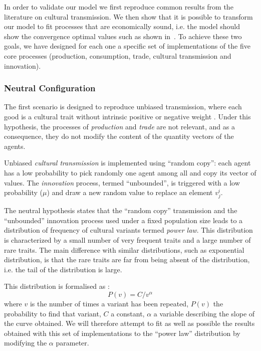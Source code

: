 \documentclass[a4paper]{article}
\begin{document}
In order to validate our model we first reproduce common results from the literature on cultural transmission. We then show that it is possible to transform our model to fit processes that are economically sound, i.e. the model should show the convergence optimal values such as shown in~\cite{gintis_emergence_2006}. To achieve these two goals, we have designed for each one a specific set of implementations of the five core processes (production, consumption, trade, cultural transmission and innovation). 


\subsubsection{Neutral Configuration}\label{sec:tc:culturalTrans}

The first scenario is designed to reproduce unbiased transmission, where each good is a cultural trait without intrinsic positive or negative weight \cite{bentley_random_2004,bentley_specialisation_2005,mesoudi_random_2009}. 
Under this hypothesis, the processes of \emph{production} and \emph{trade} are not relevant, and as a consequence, they do not modify the content of the quantity vectors of the agents.


Unbiased \emph{cultural transmission} is implemented using ``random copy'': each agent has a low probability to pick randomly one agent among all and copy its vector of values. The \emph{innovation} process, termed ``unbounded'', is triggered with a low probability ($\mu$) and draw a new random value to replace an element $v^i_j$.

The neutral hypothesis states that the ``random copy'' transmission and the ``unbounded'' innovation process used under a fixed population size leads to a distribution of frequency of cultural variants termed \emph{power law}. This distribution is characterized by a small number of very frequent traits and a large number of rare traits. The main difference with similar distributions, such as exponential distribution, is that the rare traits are far from being absent of the distribution, i.e. the tail of the distribution is large.

This distribution is formalised as : $$P(v)=C/v^\alpha $$ where $v$ is the number of times a variant has been repeated, $P(v)$ the probability to find that variant, $C$ a constant, $\alpha$ a variable describing the slope of the curve obtained. We will therefore attempt to fit as well as possible the results obtained with this set of implementations to the ``power law'' distribution by modifying the $\alpha$ parameter.
\end{document}
